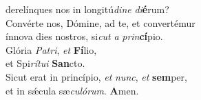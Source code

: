 \evenverse derelínques nos in longitú\textit{di}\textit{ne} \textit{di}\textbf{é}rum?\\
\oddverse Convérte nos, Dómine, ad te, et convertémur~\*\\
\oddverse ínnova dies nostros, si\textit{cut} \textit{a} \textit{prin}\textbf{cí}pio.\\
\evenverse Glória \textit{Pa}\textit{tri}, \textit{et} \textbf{Fí}lio,~\*\\
\evenverse et Spi\textit{rí}\textit{tu}\textit{i} \textbf{San}cto.\\
\oddverse Sicut erat in princípio, \textit{et} \textit{nunc}, \textit{et} \textbf{sem}per,~\*\\
\oddverse et in sǽcula sæ\textit{cu}\textit{ló}\textit{rum}. \textbf{A}men.\\

